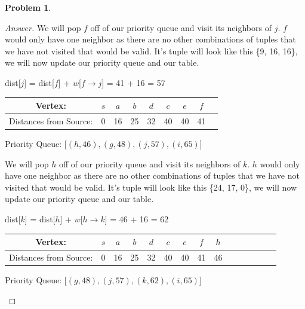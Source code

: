 \documentclass[11pt]{article}
\theoremstyle{definition}
\theoremstyle{definition}
\newtheorem{required}{Problem}
\theoremstyle{definition}
\begin{document}
\begin{required}
\begin{enumerate}[label=(\alph*)]
\begin{proof}[Answer]
We will pop $f$ off of our priority queue and visit its neighbors of $j$. $f$ would only have one neighbor as there are no other combinations of tuples that we have not visited that would be valid. It's tuple will look like this \{9, 16, 16\}, we will now update our priority queue and our table.
\begin{center}
dist[$j$] = dist[$f$]  + $w$[$f \rightarrow j$] = 41 + 16 = 57 \\
\begin{tabular}{ | c | c | c | c | c | c | c | c | c |}
 \hline
 Vertex:& $s$ & $a$ & $b$ & $d$ & $c$ & $e$ & $f$\\ 
 \hline
 Distances from Source:& 0 & 16 & 25 & 32 & 40 & 40 & 41 \\  
 \hline
\end{tabular}
\end{center}
\begin{center}
Priority Queue: [$(h, 46), (g, 48), (j, 57), (i, 65)$]
\end{center}

We will pop $h$ off of our priority queue and visit its neighbors of $k$. $h$ would only have one neighbor as there are no other combinations of tuples that we have not visited that would be valid. It's tuple will look like this \{24, 17, 0\}, we will now update our priority queue and our table.
\begin{center}
dist[$k$] = dist[$h$]  + $w$[$h \rightarrow k$] = 46 + 16 = 62 \\
\begin{tabular}{ | c | c | c | c | c | c | c | c | c | c | c | c | c | c | c |}
 \hline
 Vertex:& $s$ & $a$ & $b$ & $d$ & $c$ & $e$ & $f$ & $h$\\ 
 \hline
 Distances from Source:& 0 & 16 & 25 & 32 & 40 & 40 & 41 & 46 \\  
 \hline
\end{tabular}
\end{center}
\begin{center}
Priority Queue: [$(g, 48), (j, 57), (k,62), (i, 65)$]
\end{center}


\end{proof}
\end{enumerate}
\end{required}
\end{document}
